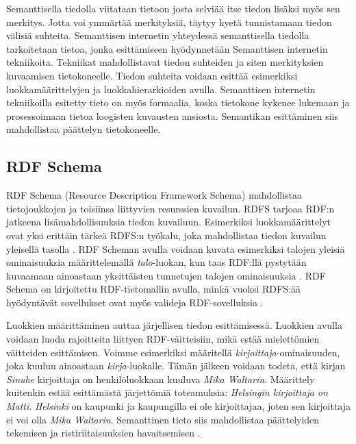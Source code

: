 \documentclass[finnish, 12pt, a4paper, elec, utf8, pdfa, online]{aaltothesis}
\begin{document}
{Semanttisella tiedolla viitataan tietoon josta selviää itse tiedon lisäksi myös sen merkitys. Jotta voi ymmärtää merkityksiä, täytyy kyetä tunnistamaan tiedon välisiä suhteita. Semanttisen internetin yhteydessä semanttisella tiedolla tarkoitetaan tietoa, jonka esittämiseen hyödynnetään Semanttisen internetin tekniikoita. Tekniikat mahdollistavat tiedon suhteiden ja siten merkityksien kuvaamisen tietokoneelle. Tiedon suhteita voidaan esittää esimerkiksi luokkamäärittelyjen ja luokkahierarkioiden avulla. Semanttisen internetin tekniikoilla esitetty tieto on myös formaalia, koska tietokone kykenee lukemaan ja prosessoimaan tietoa loogisten kuvausten ansiosta. Semantikan esittäminen siis mahdollistaa päättelyn tietokoneelle.


\subsection{RDF Schema}
RDF Schema (Resource Description Framework Schema) mahdollistaa tietojoukkojen ja toisiinsa liittyvien resurssien kuvailun. RDFS tarjoaa RDF:n jatkeena lisämahdollisuuksia tiedon kuvailuun. Esimerkiksi luokkamäärittelyt ovat yksi erittäin tärkeä RDFS:n työkalu, joka mahdollistaa tiedon kuvailun yleisellä tasolla \cite{W3C_RDFS2}. RDF Scheman avulla voidaan kuvata esimerkiksi talojen yleisiä ominaisuuksia määrittelemällä \textit{talo}-luokan, kun taas RDF:llä pystytään kuvaamaan ainoastaan yksittäisten tunnetujen talojen ominaisuuksia \cite{Antoniou}. RDF Schema on kirjoitettu RDF-tietomallin avulla, minkä vuoksi RDFS:ää hyödyntävät sovellukset ovat myös valideja RDF-sovelluksia \cite{RDF_specification_old}.

Luokkien määrittäminen auttaa järjellisen tiedon esittämisessä. Luokkien avulla voidaan luoda rajoitteita liittyen RDF-väitteisiin, mikä estää mielettömien väitteiden esittämisen. Voimme esimerkiksi määritellä \textit{kirjoittaja}-ominaisuuden, joka kuuluu ainoastaan \textit{kirja}-luokalle. Tämän jälkeen voidaan todeta, että kirjan \textit{Sinuhe} kirjoittaja on henkilöluokkaan kuuluva \textit{Mika Waltarin}. Määrittely kuitenkin estää esittämästä järjettömiä toteamuksia: \textit{Helsingin kirjoittaja on Matti}. \textit{Helsinki} on kaupunki ja kaupungilla ei ole kirjoittajaa, joten sen kirjoittaja ei voi olla \textit{Mika Waltarin}. Semanttinen tieto siis mahdollistaa päättelyiden tekemisen ja ristiriitaisuuksien havaitsemisen \cite{Antoniou}.

}
\end{document}
